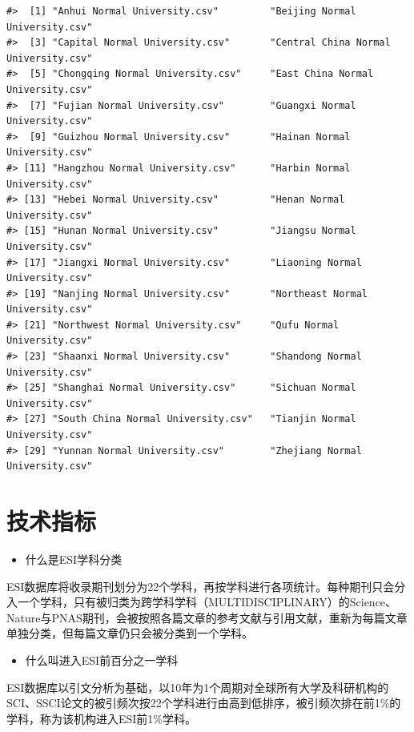 \documentclass[cn, 11pt, fancy, hide]{elegantbook}
\providecommand{\tightlist}{%
  \setlength{\itemsep}{0pt}\setlength{\parskip}{0pt}}
\begin{document}
\begin{verbatim}
#>  [1] "Anhui Normal University.csv"         "Beijing Normal University.csv"      
#>  [3] "Capital Normal University.csv"       "Central China Normal University.csv"
#>  [5] "Chongqing Normal University.csv"     "East China Normal University.csv"   
#>  [7] "Fujian Normal University.csv"        "Guangxi Normal University.csv"      
#>  [9] "Guizhou Normal University.csv"       "Hainan Normal University.csv"       
#> [11] "Hangzhou Normal University.csv"      "Harbin Normal University.csv"       
#> [13] "Hebei Normal University.csv"         "Henan Normal University.csv"        
#> [15] "Hunan Normal University.csv"         "Jiangsu Normal University.csv"      
#> [17] "Jiangxi Normal University.csv"       "Liaoning Normal University.csv"     
#> [19] "Nanjing Normal University.csv"       "Northeast Normal University.csv"    
#> [21] "Northwest Normal University.csv"     "Qufu Normal University.csv"         
#> [23] "Shaanxi Normal University.csv"       "Shandong Normal University.csv"     
#> [25] "Shanghai Normal University.csv"      "Sichuan Normal University.csv"      
#> [27] "South China Normal University.csv"   "Tianjin Normal University.csv"      
#> [29] "Yunnan Normal University.csv"        "Zhejiang Normal University.csv"
\end{verbatim}

\hypertarget{ux6280ux672fux6307ux6807}{%
\section*{技术指标}\label{ux6280ux672fux6307ux6807}}

\begin{itemize}
\tightlist
\item
  什么是ESI学科分类
\end{itemize}

ESI数据库将收录期刊划分为22个学科，再按学科进行各项统计。每种期刊只会分入一个学科，只有被归类为跨学科学科（MULTIDISCIPLINARY）的Science、Nature与PNAS期刊，会被按照各篇文章的参考文献与引用文献，重新为每篇文章单独分类，但每篇文章仍只会被分类到一个学科。

\begin{itemize}
\tightlist
\item
  什么叫进入ESI前百分之一学科
\end{itemize}

ESI数据库以引文分析为基础，以10年为1个周期对全球所有大学及科研机构的SCI、SSCI论文的被引频次按22个学科进行由高到低排序，被引频次排在前1\%的学科，称为该机构进入ESI前1\%学科。
\end{document}
